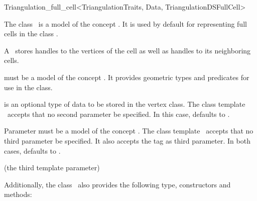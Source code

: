 \begin{ccRefClass}{Triangulation_full_cell<TriangulationTraits, Data, TriangulationDSFullCell>}

\ccDefinition

The class \ccRefName\ is a model of the concept . It
is used by default for representing full cells in the class
.

A \ccRefName\ stores handles to the vertices of the cell as well as handles
to its neighboring cells.


\ccParameters

 must be a model of the concept . It
provides geometric types and predicates for use in the
 class.

 is an optional type of data to be stored in the vertex class. The
class template \ccRefName\ accepts that no second parameter be specified. In
this case,  defaults to .

Parameter  must be a model of the concept
.
The class template \ccRefName\ accepts that no third parameter be specified.
It also accepts the tag  as third parameter. In both
cases,  defaults to .

\ccInheritsFrom

 (the third template parameter)

\ccIsModel


Additionally, the class \ccRefName\ also provides the following type,
constructors and methods:

\ccTypes


\ccCreation
{}



\end{ccRefClass}
